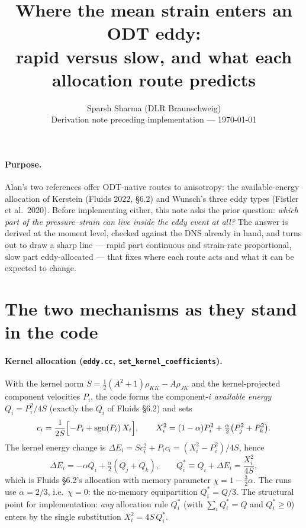 \documentclass[11pt,a4paper]{article}
\title{\vspace{-1.2em}Where the mean strain enters an ODT eddy:\\
rapid versus slow, and what each allocation route predicts}
\author{Sparsh Sharma (DLR Braunschweig)\\[0.2em]
\normalsize Derivation note preceding implementation --- \today}
\date{}
\newcommand{\Qs}{Q^{*}}
\begin{document}
\maketitle
\vspace{-2em}

\paragraph{Purpose.} Alan's two references offer ODT-native routes to
anisotropy: the available-energy allocation of Kerstein (Fluids 2022,
\S6.2) and Wunsch's three eddy types (Fistler et al.\ 2020). Before
implementing either, this note asks the prior question: \emph{which part of
the pressure--strain can live inside the eddy event at all?} The answer is
derived at the moment level, checked against the DNS already in hand, and
turns out to draw a sharp line --- rapid part continuous and strain-rate
proportional, slow part eddy-allocated --- that fixes where each route acts
and what it can be expected to change.

\section{The two mechanisms as they stand in the code}

\paragraph{Kernel allocation (\texttt{eddy.cc}, \texttt{set\_kernel\_coefficients}).}
With the kernel norm $S=\tfrac12(A^2{+}1)\rho_{KK}-A\rho_{JK}$ and the
kernel-projected component velocities $P_i$, the code forms the
component-$i$ \emph{available energy} $Q_i=P_i^2/4S$ (exactly the $Q_i$ of
Fluids \S6.2) and sets
\begin{equation}
  c_i=\frac{1}{2S}\Bigl[-P_i+\operatorname{sgn}(P_i)\,X_i\Bigr],\qquad
  X_i^2=(1-\alpha)P_i^2+\tfrac{\alpha}{2}\bigl(P_j^2+P_k^2\bigr).
\end{equation}
The kernel energy change is $\Delta E_i=Sc_i^2+P_ic_i=(X_i^2-P_i^2)/4S$,
hence
\begin{equation}
  \Delta E_i=-\alpha Q_i+\tfrac{\alpha}{2}(Q_j+Q_k),\qquad
  \Qs_i\equiv Q_i+\Delta E_i=\frac{X_i^2}{4S},
  \label{eq:alloc}
\end{equation}
which is Fluids \S6.2's allocation with memory parameter
$\chi=1-\tfrac32\alpha$. The runs use $\alpha=2/3$, i.e.\ $\chi=0$: the
no-memory equipartition $\Qs_i=Q/3$. The structural point for
implementation: \emph{any} allocation rule $\Qs_i$ (with $\sum_i\Qs_i=Q$
and $\Qs_i\ge0$) enters by the single substitution $X_i^2=4S\,\Qs_i$.
\end{document}

